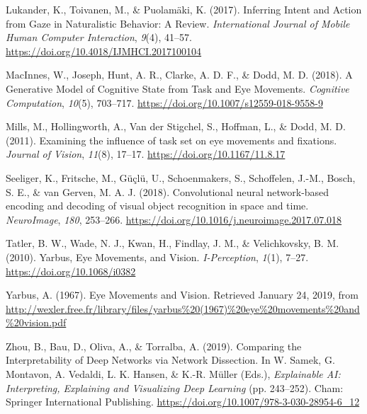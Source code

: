\documentclass[
  english,
  man,floatsintext]{apa6}
\begin{document}
\leavevmode\hypertarget{ref-lukanderInferringIntentAction2017}{}%
Lukander, K., Toivanen, M., \& Puolamäki, K. (2017). Inferring Intent and Action from Gaze in Naturalistic Behavior: A Review. \emph{International Journal of Mobile Human Computer Interaction}, \emph{9}(4), 41--57. \url{https://doi.org/10.4018/IJMHCI.2017100104}

\leavevmode\hypertarget{ref-macinnesjosephGenerativeModelCognitive2018}{}%
MacInnes, W., Joseph, Hunt, A. R., Clarke, A. D. F., \& Dodd, M. D. (2018). A Generative Model of Cognitive State from Task and Eye Movements. \emph{Cognitive Computation}, \emph{10}(5), 703--717. \url{https://doi.org/10.1007/s12559-018-9558-9}

\leavevmode\hypertarget{ref-millsExaminingInfluenceTask2011}{}%
Mills, M., Hollingworth, A., Van der Stigchel, S., Hoffman, L., \& Dodd, M. D. (2011). Examining the influence of task set on eye movements and fixations. \emph{Journal of Vision}, \emph{11}(8), 17--17. \url{https://doi.org/10.1167/11.8.17}

\leavevmode\hypertarget{ref-seeligerConvolutionalNeuralNetworkbased2018}{}%
Seeliger, K., Fritsche, M., Güçlü, U., Schoenmakers, S., Schoffelen, J.-M., Bosch, S. E., \& van Gerven, M. A. J. (2018). Convolutional neural network-based encoding and decoding of visual object recognition in space and time. \emph{NeuroImage}, \emph{180}, 253--266. \url{https://doi.org/10.1016/j.neuroimage.2017.07.018}

\leavevmode\hypertarget{ref-tatlerYarbusEyeMovements2010}{}%
Tatler, B. W., Wade, N. J., Kwan, H., Findlay, J. M., \& Velichkovsky, B. M. (2010). Yarbus, Eye Movements, and Vision. \emph{I-Perception}, \emph{1}(1), 7--27. \url{https://doi.org/10.1068/i0382}

\leavevmode\hypertarget{ref-yarbusEyeMovementsVision1967}{}%
Yarbus, A. (1967). Eye Movements and Vision. Retrieved January 24, 2019, from \url{http://wexler.free.fr/library/files/yarbus\%20(1967)\%20eye\%20movements\%20and\%20vision.pdf}

\leavevmode\hypertarget{ref-zhouComparingInterpretabilityDeep2019}{}%
Zhou, B., Bau, D., Oliva, A., \& Torralba, A. (2019). Comparing the Interpretability of Deep Networks via Network Dissection. In W. Samek, G. Montavon, A. Vedaldi, L. K. Hansen, \& K.-R. Müller (Eds.), \emph{Explainable AI: Interpreting, Explaining and Visualizing Deep Learning} (pp. 243--252). Cham: Springer International Publishing. \url{https://doi.org/10.1007/978-3-030-28954-6_12}

\endgroup
\end{document}
